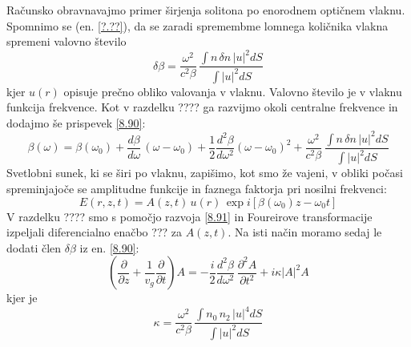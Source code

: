 Računsko obravnavajmo primer širjenja solitona po enorodnem optičnem
vlaknu. Spomnimo se (en. \ref{?.??}), da se zaradi spremembme lomnega
količnika vlakna spremeni valovno število 
\begin{equation}
\delta\beta=\frac{\omega^{2}}{c^{2}\beta}\,\frac{\int n\,\delta n\,|u|^{2}dS}{\int|u|^{2}dS}\label{8.90}
\end{equation}
 kjer $u(r)$ opisuje prečno obliko valovanja v vlaknu. Valovno število
je v vlaknu funkcija frekvence. Kot v razdelku ???? ga razvijmo okoli
centralne frekvence in dodajmo še prispevek \ref{8.90}: 
\begin{equation}
\beta\left(\omega\right)=\beta\left(\omega_{0}\right)+\frac{d\beta}{d\omega}\,(\omega-\omega_{0})+\frac{1}{2}\frac{d^{2}\beta}{d\omega^{2}}(\omega-\omega_{0})^{2}+\frac{\omega^{2}}{c^{2}\beta}\,\frac{\int n\,\delta n\,|u|^{2}dS}{\int|u|^{2}dS}\label{8.91}
\end{equation}
 Svetlobni sunek, ki se širi po vlaknu, zapišimo, kot smo že vajeni,
v obliki počasi spreminjajoče se amplitudne funkcije in faznega faktorja
pri nosilni frekvenci: 
\begin{equation}
E\left(r,z,t\right)=A\left(z,t\right)\, u\left(r\right)\,\exp i\left[\beta\left(\omega_{0}\right)z-\omega_{0}t\right]\label{8.92}
\end{equation}
 V razdelku ???? smo s pomočjo razvoja \ref{8.91} in Foureirove transformacije
izpeljali diferencialno enačbo ??? za $A\left(z,t\right)$. Na isti
način moramo sedaj le dodati člen $\delta\beta$ iz en. \ref{8.90}:
\begin{equation}
(\frac{\partial}{\partial z}+\frac{1}{v_{g}}\frac{\partial}{\partial t})A=-\frac{i}{2}\frac{d^{2}\beta}{d\omega^{2}}\,\frac{\partial^{2}A}{\partial t^{2}}+i\kappa|A|^{2}A\label{8.93}
\end{equation}
 kjer je 
\begin{equation}
\kappa=\frac{\omega^{2}}{c^{2}\beta}\,\frac{\int n_{0}\, n_{2}\,|u|^{4}dS}{\int|u|^{2}dS}\label{8.94}
\end{equation}


